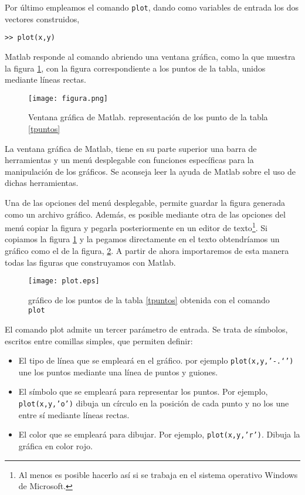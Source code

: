 Por último empleamos el comando \texttt{plot}, dando como variables de entrada los dos vectores construidos,
 
\begin{verbatim}
>> plot(x,y)
\end{verbatim}

Matlab responde al comando abriendo una ventana gráfica, como la que muestra la figura \ref{fig:ventana}, con la figura correspondiente a los puntos de la tabla, unidos mediante líneas rectas.

\begin{figure}[h]
\centering
\texttt{[image: figura.png]}
\caption{Ventana gráfica de Matlab. representación de los punto de la tabla \ref{tpuntos}}
\label{fig:ventana}
\end{figure}

La ventana gráfica de Matlab, tiene en su parte superior una barra de herramientas y un menú desplegable con funciones específicas para la manipulación de los gráficos. Se aconseja leer la ayuda de Matlab sobre el uso de dichas herramientas.

Una de las opciones del menú desplegable, permite guardar la figura generada como un archivo gráfico. Además, es posible mediante otra de las opciones del menú copiar la figura y pegarla posteriormente en un editor de texto\footnote{Al menos es posible hacerlo así si se trabaja en el sistema operativo Windows de Microsoft.}. Si copiamos la figura \ref{fig:ventana} y la pegamos directamente en el texto obtendríamos un gráfico como el de la figura, \ref{fig:plot}. A partir de ahora importaremos de esta manera todas las figuras que construyamos con Matlab.

\begin{figure}[h]
\centering
\texttt{[image: plot.eps]}
\caption{gráfico de los puntos de la tabla \ref{tpuntos} obtenida con el comando \texttt{plot}}
\label{fig:plot}
\end{figure}
El comando plot admite un tercer parámetro de entrada. Se trata de símbolos, escritos entre comillas simples, que permiten definir: 
\begin{itemize}
\item El tipo de línea que se empleará en el gráfico. por ejemplo \texttt{plot(x,y,'-.`')} une los puntos mediante una línea de puntos y guiones.
\item El símbolo que se empleará para representar los puntos. Por ejemplo, \texttt{plot(x,y,'o')} dibuja un círculo en la posición de cada punto y no los une entre sí mediante líneas rectas.
\item El color que se empleará para dibujar. Por ejemplo, \texttt{plot(x,y,'r')}. Dibuja la gráfica en color rojo.
\end{itemize}


